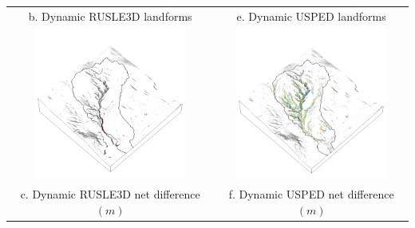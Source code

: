 \documentclass{standalone}
\begin{document}
\begin{tabular}{m{} m{}}
\multicolumn{1}{c}{b. Dynamic RUSLE3D landforms} &
\multicolumn{1}{c}{e. Dynamic USPED landforms}\\
%
\multicolumn{1}{c}{\includegraphics[height=50mm]{../../images/rusle_3d/difference.png}} &
\multicolumn{1}{c}{\includegraphics[height=50mm]{../../images/usped_3d/difference.png}}\\
\multicolumn{1}{c}{c. Dynamic RUSLE3D net difference $(m)$} & 
\multicolumn{1}{c}{f. Dynamic USPED net difference $(m)$}\\

%
\end{tabular}

\end{document}
